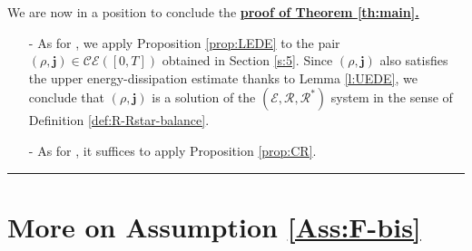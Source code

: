 \documentclass[11pt,reqno]{amsart}
\numberwithin{equation}{section}
\newcommand{\CE}[2]{\calC \calE([#1,#2])}
\newcommand{\calC}{\mathcal{C}}
\newcommand{\calE}{\mathcal{E}}
\theoremstyle{definition}
\newcommand{\QED}{\mbox{}\hfill\rule{5pt}{5pt}\medskip\par}
\def\calS{\mathscr E}
\newcommand{\scrR}{\mathscr{R}}
\newcommand{\jj}{{\boldsymbol{j}}}
\newcommand{\EEE}{\color{black}}
\numberwithin{equation}{section}
\begin{document}
\par
We are now in a position to conclude the 
\underline{\textbf{proof of Theorem \ref{th:main}.}} 
\begin{itemize}
\item[-]
As for , we  apply Proposition \ref{prop:LEDE} to the pair $(\rho,\jj) \in \CE0T$ obtained in Section \ref{s:5}. 
Since $(\rho,\jj)$ also satisfies the upper energy-dissipation estimate thanks to Lemma \ref{l:UEDE}, we conclude that $(\rho,\jj)$ is a solution of the $(\calS,\scrR,\scrR^*)$
system in the sense of Definition \ref{def:R-Rstar-balance}. 
\item[-] As for , it suffices to apply Proposition \ref{prop:CR}. 
\end{itemize}
\QED

\EEE
\section{More on Assumption \ref{Ass:F-bis}}
\label{s:lip} 
\end{document}
